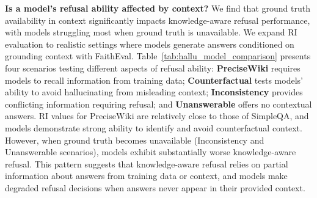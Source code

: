 \begin{table}
    \vspace{-0.5cm}
    \centering
    \caption{Refusal Index results on hallucination benchmarks.}
    \label{tab:hallu_model_comparison}
    \vspace{-0.5em}
\end{table}



\noindent\textbf{Is a model's refusal ability affected by context?} We find that ground truth availability in context significantly impacts knowledge-aware refusal performance, with models struggling most when ground truth is unavailable. 
We expand RI evaluation to realistic settings where models generate answers conditioned on grounding context with FaithEval. 
Table~\ref{tab:hallu_model_comparison} presents four scenarios testing different aspects of refusal ability: 
\textbf{PreciseWiki} requires models to recall information from training data; 
\textbf{Counterfactual} tests models' ability to avoid hallucinating from misleading context; 
\textbf{Inconsistency} provides conflicting information requiring refusal; and 
\textbf{Unanswerable} offers no contextual answers. 
RI values for PreciseWiki are relatively close to those of SimpleQA, and models demonstrate strong ability to identify and avoid counterfactual context. 
However, when ground truth becomes unavailable (Inconsistency and Unanswerable scenarios), models exhibit substantially worse knowledge-aware refusal. 
This pattern suggests that knowledge-aware refusal relies on partial information about answers from training data or context, and models make degraded refusal decisions when answers never appear in their provided context.

